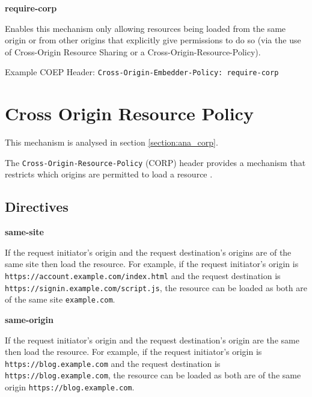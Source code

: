 \documentclass{mscreport}
\begin{document}
\vspace{0.7cm} \noindent
\textbf{require-corp}

\vspace{0.3cm} \noindent
Enables this mechanism only allowing resources being loaded from the same origin or from other origins that explicitly give permissions to do so (via the use of Cross-Origin Resource Sharing or a Cross-Origin-Resource-Policy).

\vspace{0.3cm} \noindent
Example COEP Header: \texttt{Cross-Origin-Embedder-Policy: require-corp}


\section{Cross Origin Resource Policy}
\label{section:bg_corp}

This mechanism is analysed in section \ref{section:ana_corp}.

\vspace{0.3cm} \noindent
The \texttt{Cross-Origin-Resource-Policy} (CORP) header provides a mechanism that restricts which origins are permitted to load a resource \cite{Apple_undated-au}.

\subsection{Directives}
\textbf{same-site}

\vspace{0.3cm} \noindent
If the request initiator's origin and the request destination's origins are of the same site then load the resource. For example, if the request initiator's origin is \newline \texttt{https://account.example.com/index.html} and the request destination is \newline \texttt{https://signin.example.com/script.js}, the resource can be loaded as both are of the same site \texttt{example.com}.

\vspace{0.7cm} \noindent
\textbf{same-origin}

\vspace{0.3cm} \noindent
If the request initiator’s origin and the request destination's origin are the same then load the resource. For example, if the request initiator’s origin is \texttt{https://blog.example.com} and the request destination is \texttt{https://blog.example.com}, the resource can be loaded as both are of the same origin \texttt{https://blog.example.com}.
\end{document}
